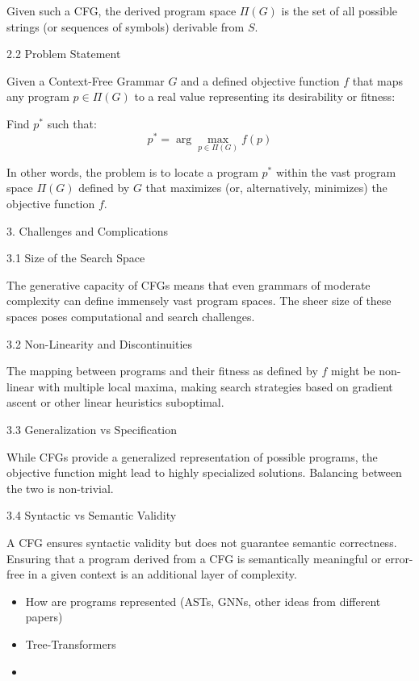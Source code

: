 Given such a CFG, the derived program space \( \Pi(G) \) is the set of all possible strings (or sequences of symbols) derivable from \( S \).

2.2 Problem Statement

Given a Context-Free Grammar \( G \) and a defined objective function \( f \) that maps any program \( p \in \Pi(G) \) to a real value representing its desirability or fitness:

Find \( p^* \) such that:
\[ p^* = \arg\max_{p \in \Pi(G)} f(p) \]

In other words, the problem is to locate a program \( p^* \) within the vast program space \( \Pi(G) \) defined by \( G \) that maximizes (or, alternatively, minimizes) the objective function \( f \).

3. Challenges and Complications

3.1 Size of the Search Space

The generative capacity of CFGs means that even grammars of moderate complexity can define immensely vast program spaces. The sheer size of these spaces poses computational and search challenges.

3.2 Non-Linearity and Discontinuities

The mapping between programs and their fitness as defined by \( f \) might be non-linear with multiple local maxima, making search strategies based on gradient ascent or other linear heuristics suboptimal.

3.3 Generalization vs Specification

While CFGs provide a generalized representation of possible programs, the objective function might lead to highly specialized solutions. Balancing between the two is non-trivial.

3.4 Syntactic vs Semantic Validity

A CFG ensures syntactic validity but does not guarantee semantic correctness. Ensuring that a program derived from a CFG is semantically meaningful or error-free in a given context is an additional layer of complexity.

\begin{itemize}
    \item How are programs represented (ASTs, GNNs, other ideas from different papers)
    \item Tree-Transformers
    \item 
\end{itemize}


